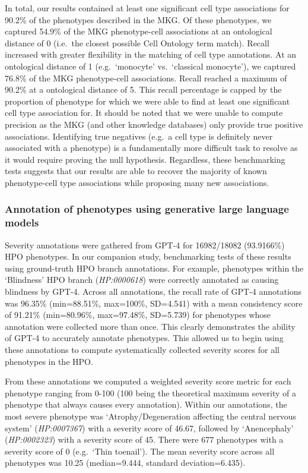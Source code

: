 \documentclass[
]{agujournal2019}
\begin{document}
In total, our results contained at least one significant cell type
associations for 90.2\% of the phenotypes described in the MKG. Of these
phenotypes, we captured 54.9\% of the MKG phenotype-cell associations at
an ontological distance of 0 (i.e.~the closest possible Cell Ontology
term match). Recall increased with greater flexibility in the matching
of cell type annotations. At an ontological distance of 1
(e.g.~`monocyte' vs.~`classical monocyte'), we captured 76.8\% of the
MKG phenotype-cell associations. Recall reached a maximum of 90.2\% at a
ontological distance of 5. This recall percentage is capped by the
proportion of phenotype for which we were able to find at least one
significant cell type association for. It should be noted that we were
unable to compute precision as the MKG (and other knowledge databases)
only provide true positive associations. Identifying true negatives
(e.g.~a cell type is definitely never associated with a phenotype) is a
fundamentally more difficult task to resolve as it would require proving
the null hypothesis. Regardless, these benchmarking tests suggests that
our results are able to recover the majority of known phenotype-cell
type associations while proposing many new associations.

\subsubsection{Annotation of phenotypes using generative large language
models}\label{annotation-of-phenotypes-using-generative-large-language-models}

Severity annotations were gathered from GPT-4 for 16982/18082
(93.9166\%) HPO phenotypes. In our companion study, benchmarking tests
of these results using ground-truth HPO branch annotations. For example,
phenotypes within the `Blindness' HPO branch (\emph{HP:0000618}) were
correctly annotated as causing blindness by GPT-4. Across all
annotations, the recall rate of GPT-4 annotations was 96.35\%
(min=88.51\%, max=100\%, SD=4.541) with a mean consistency score of
91.21\% (min=80.96\%, max=97.48\%, SD=5.739) for phenotypes whose
annotation were collected more than once. This clearly demonstrates the
ability of GPT-4 to accurately annotate phenotypes. This allowed us to
begin using these annotations to compute systematically collected
severity scores for all phenotypes in the HPO.

From these annotations we computed a weighted severity score metric for
each phenotype ranging from 0-100 (100 being the theoretical maximum
severity of a phenotype that always causes every annotation). Within our
annotations, the most severe phenotype was `Atrophy/Degeneration
affecting the central nervous system' (\emph{HP:0007367}) with a
severity score of 46.67, followed by `Anencephaly' (\emph{HP:0002323})
with a severity score of 45. There were 677 phenotypes with a severity
score of 0 (e.g.~`Thin toenail'). The mean severity score across all
phenotypes was 10.25 (median=9.444, standard deviation=6.435).
\end{document}
